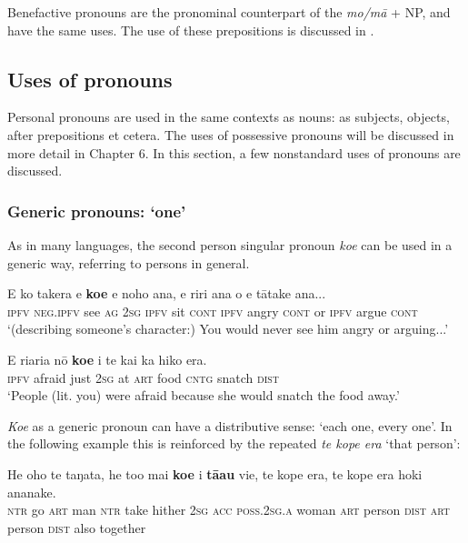 Benefactive pronouns are the pronominal counterpart of the  \textit{mo/mā} + NP, and have the same uses. The use of these prepositions is discussed in .

\subsection{Uses of pronouns}\label{sec:4.2.4}

Personal pronouns are used in the same contexts as nouns: as subjects, objects, after prepositions et cetera. The uses of possessive pronouns will be discussed in more detail in Chapter 6. In this section, a few nonstandard uses of pronouns are discussed.

\subsubsection[Generic pronouns: ‘one’]{Generic pronouns: ‘one’}\label{sec:4.2.4.1}

As in many languages, the second person singular pronoun \textit{koe} can be used in a generic way, referring to persons in general. 

\ea\label{ex:4.3}
\gll E ko takera e \textbf{koe} e noho {\ꞌ}ana, e riri {\ꞌ}ana {\ꞌ}o e tātake {\ꞌ}ana... \\
\textsc{ipfv} \textsc{neg.ipfv} see \textsc{ag} \textsc{2sg} \textsc{ipfv} sit \textsc{cont} \textsc{ipfv} angry \textsc{cont} or \textsc{ipfv} argue \textsc{cont} \\

\glt 
‘(describing someone’s character:) You would never see him angry or arguing...’ \textstyleExampleref{[R302.050]} 
\z

\ea\label{ex:4.4}
\gll E ri{\ꞌ}ari{\ꞌ}a nō \textbf{koe} {\ꞌ}i te kai ka hiko era. \\
\textsc{ipfv} afraid just \textsc{2sg} at \textsc{art} food \textsc{cntg} snatch \textsc{dist} \\

\glt
‘People (lit. you) were afraid because she would snatch the food away.’ \textstyleExampleref{[R368.104]} 
\z

\textit{Koe} as a generic pronoun can have a distributive sense: ‘each one, every one’. In the following example this is reinforced by the repeated \textit{te kope era} ‘that person’:

\ea\label{ex:4.5}
\gll He oho te taŋata, he to{\ꞌ}o mai \textbf{koe} i \textbf{tā{\ꞌ}au} vi{\ꞌ}e, te kope era, te kope era hoki ananake.\\
\textsc{ntr} go \textsc{art} man \textsc{ntr} take hither \textsc{2sg} \textsc{acc} \textsc{poss.2sg.a} woman \textsc{art} person \textsc{dist} \textsc{art} person \textsc{dist} also together\\

